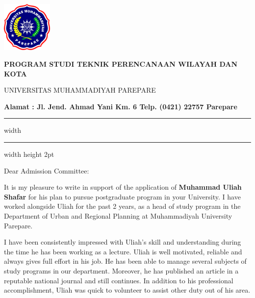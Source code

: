 \documentclass[12pt,a4paper]{letter}
\begin{document}
	\begin{minipage}[b]{0.13\linewidth}
			\includegraphics[height=2.5cm]{logo2.png}
	\end{minipage}
\begin{minipage}[b]{35em}
            \Centering
            \color{red}
	\begin{spacing}{1}
\textbf{PROGRAM STUDI TEKNIK PERENCANAAN WILAYAH DAN KOTA}

UNIVERSITAS MUHAMMADIYAH PAREPARE

\textbf{Alamat : Jl. Jend. Ahmad Yani Km. 6 Telp. (0421) 22757 Parepare}
	\end{spacing}
\end{minipage}

\vspace{0.2em}%

{\color{red}\hrule width \hsize \kern 1mm \hrule width \hsize height 2pt}



\hspace*{\longindentation}\DTMtoday\hspace*{\fill}\par %



\vspace{10pt}
Dear Admission Committee:

It is my pleasure to write in support of the application of \textbf{Muhammad Uliah Shafar} for his plan to pursue postgraduate program in your University.
I have worked alongside Uliah for the past 2 years, as a head of study program in the Department of Urban and Regional Planning at Muhammadiyah University Parepare.

I have been consistently impressed with Uliah's skill and understanding during the time he has been working as a lecture.
Uliah is well motivated, reliable and always gives full effort in his job.
He has been able to manage several subjects of study programs in our department.
Moreover, he has published an article in a reputable national journal and still continues.
In addition to his professional accomplishment, Uliah was quick to volunteer to assist other duty out of his area.
\end{document}
